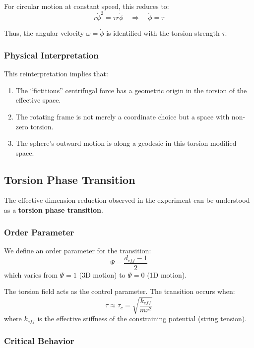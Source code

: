 \documentclass[UTF8]{ctex}\n\documentclass[12pt,a4paper]{article}
\begin{document}
For circular motion at constant speed, this reduces to:
\begin{equation}
    r\dot{\phi}^2 = \tau r \dot{\phi} \quad \Rightarrow \quad \dot{\phi} = \tau
\end{equation}

Thus, the angular velocity $\omega = \dot{\phi}$ is identified with the torsion strength $\tau$.

\subsubsection{Physical Interpretation}

This reinterpretation implies that:
\begin{enumerate}
    \item The ``fictitious'' centrifugal force has a geometric origin in the torsion of the effective space.
    \item The rotating frame is not merely a coordinate choice but a space with non-zero torsion.
    \item The sphere's outward motion is along a geodesic in this torsion-modified space.
\end{enumerate}

\subsection{Torsion Phase Transition}

The effective dimension reduction observed in the experiment can be understood as a \textbf{torsion phase transition}.

\subsubsection{Order Parameter}

We define an order parameter for the transition:
\begin{equation}
    \Psi = \frac{d_{eff} - 1}{2}
\end{equation}
which varies from $\Psi = 1$ (3D motion) to $\Psi = 0$ (1D motion).

The torsion field acts as the control parameter. The transition occurs when:
\begin{equation}
    \tau \approx \tau_c = \sqrt{\frac{k_{eff}}{mr^2}}
\end{equation}
where $k_{eff}$ is the effective stiffness of the constraining potential (string tension).

\subsubsection{Critical Behavior}
\end{document}

